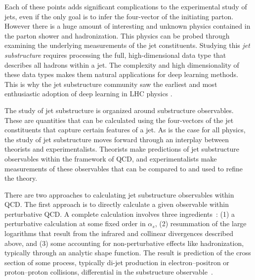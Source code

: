 Each of these points adds significant complications to the experimental study of jets, even if the only goal is to infer the four-vector of the initiating parton.
However there is a huge amount of interesting and unknown physics contained in the parton shower and hadronization.
This physics can be probed through examining the underlying measurements of the jet constituents.
Studying this \textit{jet substructure} requires processing the full, high-dimensional data type that describes all hadrons within a jet.
The complexity and high dimensionality of these data types makes them natural applications for deep learning methods.
This is why the jet substructure community saw the earliest and most enthusiastic adoption of deep learning in LHC physics \cite{Larkoski:2017jix, Kogler:2018hem}.

The study of jet substructure is organized around substructure observables.
These are quantities that can be calculated using the four-vectors of the jet constituents that capture certain features of a jet.
As is the case for all physics, the study of jet substructure moves forward through an interplay between theorists and experimentalists.
Theorists make predictions of jet substructure observables within the framework of QCD, and experimentalists make measurements of these observables that can be compared to and used to refine the theory.

There are two approaches to calculating jet substructure observables within QCD.
The first approach is to directly calculate a given observable within perturbative QCD.
A complete calculation involves three ingredients~\cite{Larkoski:2017jix}: (1) a perturbative calculation at some fixed order in $\alpha_s$, (2) resummation of the large logarithms that result from the infrared and collinear divergences described above, and (3) some accounting for non-perturbative effects like hadronization, typically through an analytic shape function.
The result is prediction of the cross section of some process, typically di-jet production in electron--positron or proton--proton collisions, differential in the substructure observable~\cite{Dasgupta:2001sh}.

